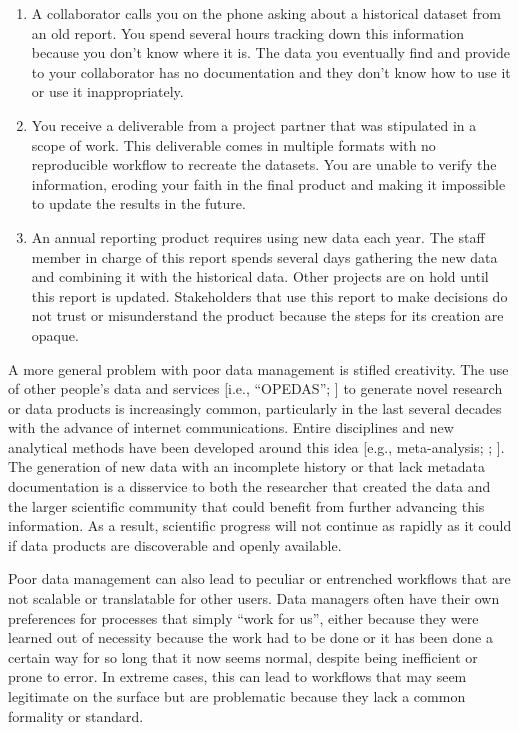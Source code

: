 \documentclass[
]{book}
\providecommand{\tightlist}{%
  \setlength{\itemsep}{0pt}\setlength{\parskip}{0pt}}
\begin{document}
\begin{enumerate}
\def\labelenumi{\arabic{enumi})}
\tightlist
\item
  A collaborator calls you on the phone asking about a historical dataset from an old report. You spend several hours tracking down this information because you don't know where it is. The data you eventually find and provide to your collaborator has no documentation and they don't know how to use it or use it inappropriately.
\item
  You receive a deliverable from a project partner that was stipulated in a scope of work. This deliverable comes in multiple formats with no reproducible workflow to recreate the datasets. You are unable to verify the information, eroding your faith in the final product and making it impossible to update the results in the future.
\item
  An annual reporting product requires using new data each year. The staff member in charge of this report spends several days gathering the new data and combining it with the historical data. Other projects are on hold until this report is updated. Stakeholders that use this report to make decisions do not trust or misunderstand the product because the steps for its creation are opaque.
\end{enumerate}

A more general problem with poor data management is stifled creativity. The use of other people's data and services {[}i.e., ``OPEDAS''; \citet{Mons18}{]} to generate novel research or data products is increasingly common, particularly in the last several decades with the advance of internet communications. Entire disciplines and new analytical methods have been developed around this idea {[}e.g., meta-analysis; \citet{Carpenter09}; \citet{Lortie14}{]}. The generation of new data with an incomplete history or that lack metadata documentation is a disservice to both the researcher that created the data and the larger scientific community that could benefit from further advancing this information. As a result, scientific progress will not continue as rapidly as it could if data products are discoverable and openly available.

Poor data management can also lead to peculiar or entrenched workflows that are not scalable or translatable for other users. Data managers often have their own preferences for processes that simply ``work for us'', either because they were learned out of necessity because the work had to be done or it has been done a certain way for so long that it now seems normal, despite being inefficient or prone to error. In extreme cases, this can lead to workflows that may seem legitimate on the surface but are problematic because they lack a common formality or standard.
\end{document}
